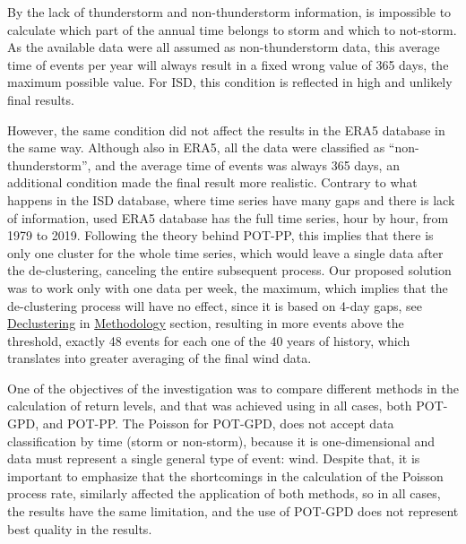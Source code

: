 \documentclass[12pt,oneside]{reedthesis}
\begin{document}
By the lack of thunderstorm and non-thunderstorm information, is impossible to calculate which part of the annual time belongs to storm and which to not-storm. As the available data were all assumed as non-thunderstorm data, this average time of events per year will always result in a fixed wrong value of 365 days, the maximum possible value. For ISD, this condition is reflected in high and unlikely final results.

However, the same condition did not affect the results in the ERA5 database in the same way. Although also in ERA5, all the data were classified as ``non-thunderstorm'', and the average time of events was always 365 days, an additional condition made the final result more realistic. Contrary to what happens in the ISD database, where time series have many gaps and there is lack of information, used ERA5 database has the full time series, hour by hour, from 1979 to 2019. Following the theory behind POT-PP, this implies that there is only one cluster for the whole time series, which would leave a single data after the de-clustering, canceling the entire subsequent process. Our proposed solution was to work only with one data per week, the maximum, which implies that the de-clustering process will have no effect, since it is based on 4-day gaps, see \protect\hyperlink{decluster}{Declustering} in \protect\hyperlink{rmd-method}{Methodology} section, resulting in more events above the threshold, exactly 48 events for each one of the 40 years of history, which translates into greater averaging of the final wind data.

One of the objectives of the investigation was to compare different methods in the calculation of return levels, and that was achieved using in all cases, both POT-GPD, and POT-PP. The Poisson for POT-GPD, does not accept data classification by time (storm or non-storm), because it is one-dimensional and data must represent a single general type of event: wind. Despite that, it is important to emphasize that the shortcomings in the calculation of the Poisson process rate, similarly affected the application of both methods, so in all cases, the results have the same limitation, and the use of POT-GPD does not represent best quality in the results.
\end{document}
